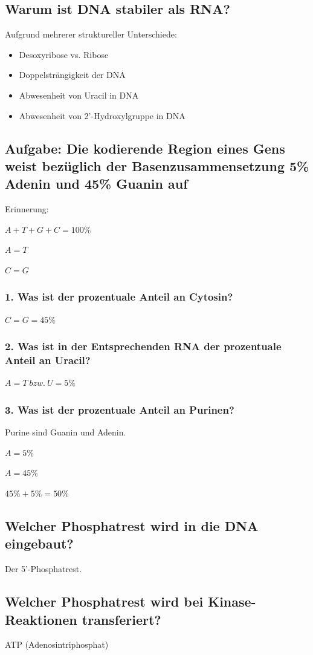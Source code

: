 \documentclass{article}
\begin{document}
\subsection*{Warum ist DNA stabiler als RNA?}
Aufgrund mehrerer struktureller Unterschiede: 
\begin{itemize}
    \item Desoxyribose vs. Ribose
    \item Doppelsträngigkeit der DNA
    \item Abwesenheit von Uracil in DNA
    \item Abwesenheit von 2'-Hydroxylgruppe in DNA
\end{itemize}

\subsection*{Aufgabe: Die kodierende Region eines Gens weist bezüglich der Basenzusammensetzung 5\% Adenin und 45\% Guanin auf}
Erinnerung: \newline
\centerline{$A+T+G+C=100\%$}
\centerline{$A = T$}
\centerline{$C = G$}
\subsubsection*{1. Was ist der prozentuale Anteil an Cytosin?}
\centerline{$C = G = 45\%$}
\subsubsection*{2. Was ist in der Entsprechenden RNA der prozentuale Anteil an Uracil?} 
\centerline{$A = T\ bzw.\ U = 5\%$}
\subsubsection*{3. Was ist der prozentuale Anteil an Purinen? } 
Purine sind Guanin und Adenin. \newline
\centerline{$A = 5\%$} \newline
\centerline{$A = 45\%$}
\centerline{$45\% + 5\% = 50\%$}

\subsection*{Welcher Phosphatrest wird in die DNA eingebaut?}
Der 5'-Phosphatrest. 

\subsection*{Welcher Phosphatrest wird bei Kinase-Reaktionen transferiert?}
 ATP (Adenosintriphosphat)
 
\end{document}

